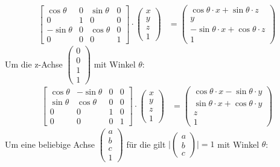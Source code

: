 \documentclass[titlepage, 11pt, a4paper, ngerman]{article}
\begin{document}
\begin{align*}
    \begin{bmatrix}
    \cos{\theta} & 0 & \sin{\theta} & 0 \\
    0 & 1 & 0 & 0 \\
    - \sin{\theta} & 0 & \cos{\theta} & 0 \\
    0 & 0 & 0 & 1
    \end{bmatrix} \cdot
    \begin{pmatrix}
    x \\ y \\ z \\ 1
    \end{pmatrix} &=
    \begin{pmatrix}
    \cos{\theta} \cdot x + \sin{\theta} \cdot z \\
    y \\
    - \sin{\theta} \cdot x + \cos{\theta} \cdot z \\
    1
    \end{pmatrix}
\end{align*}
\bigbreak
Um die z-Achse $
\begin{pmatrix}
0 \\
0 \\
1 \\
1
\end{pmatrix}$ mit Winkel $\theta$:
\begin{align*}
    \begin{bmatrix}
    \cos{\theta} & - \sin{\theta} & 0 & 0 \\
    \sin{\theta} & \cos{\theta} & 0 & 0 \\
    0 & 0 & 1 & 0 \\
    0 & 0 & 0 & 1
    \end{bmatrix} \cdot
    \begin{pmatrix}
    x \\ y \\ z \\ 1
    \end{pmatrix} &=
    \begin{pmatrix}
    \cos{\theta} \cdot x - \sin{\theta} \cdot y \\
    \sin{\theta} \cdot x + \cos{\theta} \cdot y \\
    z \\
    1
    \end{pmatrix}
\end{align*}
\bigbreak
Um eine beliebige Achse $
\begin{pmatrix}
a \\
b \\
c \\
1
\end{pmatrix} $ für die gilt $ \Biggl|\begin{pmatrix}
a \\
b \\
c
\end{pmatrix}\Biggl| = 1$ mit Winkel $\theta$:
\end{document}
